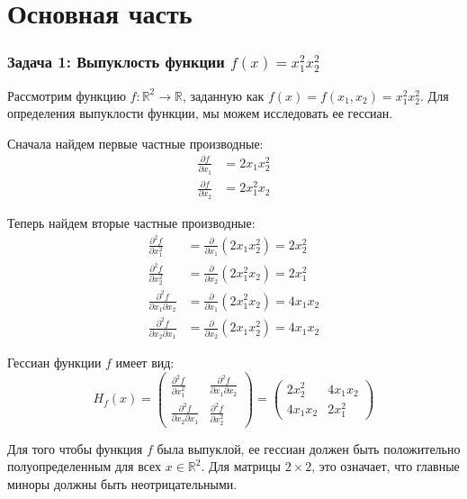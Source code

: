\documentclass[a4paper,12pt]{article}
\title{}
\author{}
\date{}
\begin{document}
	
	\section*{Основная часть}
	

	
	\subsubsection*{Задача 1: Выпуклость функции $f(x) = x_1^2 x_2^2$}
	
	Рассмотрим функцию $f: \mathbb{R}^2 \rightarrow \mathbb{R}$, заданную как $f(x) = f(x_1, x_2) = x_1^2 x_2^2$. Для определения выпуклости функции, мы можем исследовать ее гессиан.
	
	Сначала найдем первые частные производные:
	\begin{align*}
		\frac{\partial f}{\partial x_1} &= 2x_1 x_2^2 \\
		\frac{\partial f}{\partial x_2} &= 2x_1^2 x_2
	\end{align*}
	
	Теперь найдем вторые частные производные:
	\begin{align*}
		\frac{\partial^2 f}{\partial x_1^2} &= \frac{\partial}{\partial x_1} (2x_1 x_2^2) = 2x_2^2 \\
		\frac{\partial^2 f}{\partial x_2^2} &= \frac{\partial}{\partial x_2} (2x_1^2 x_2) = 2x_1^2 \\
		\frac{\partial^2 f}{\partial x_1 \partial x_2} &= \frac{\partial}{\partial x_1} (2x_1^2 x_2) = 4x_1 x_2 \\
		\frac{\partial^2 f}{\partial x_2 \partial x_1} &= \frac{\partial}{\partial x_2} (2x_1 x_2^2) = 4x_1 x_2
	\end{align*}
	
	Гессиан функции $f$ имеет вид:
	$$
	H_f(x) = \begin{pmatrix}
		\frac{\partial^2 f}{\partial x_1^2} & \frac{\partial^2 f}{\partial x_1 \partial x_2} \\
		\frac{\partial^2 f}{\partial x_2 \partial x_1} & \frac{\partial^2 f}{\partial x_2^2}
	\end{pmatrix} =
	\begin{pmatrix}
		2x_2^2 & 4x_1 x_2 \\
		4x_1 x_2 & 2x_1^2
	\end{pmatrix}
	$$
	
	Для того чтобы функция $f$ была выпуклой, ее гессиан должен быть положительно полуопределенным для всех $x \in \mathbb{R}^2$. Для матрицы $2 \times 2$, это означает, что главные миноры должны быть неотрицательными.
	
\end{document}
